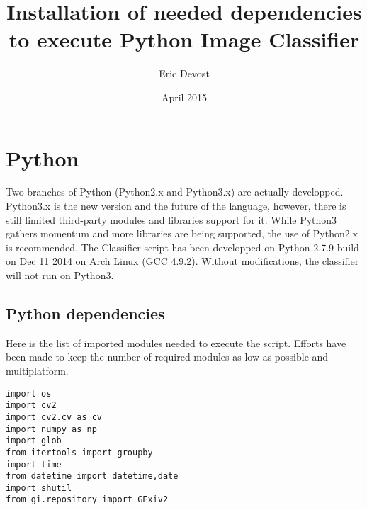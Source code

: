 \documentclass[a4paper, 11pt]{article}
\title{Installation of needed dependencies to execute Python Image Classifier}
\author{Eric Devost}
\date{April 2015}
\begin{document}
\maketitle
\newpage

\section{Python}
Two branches of Python (Python2.x and Python3.x) are actually developped. Python3.x is the new version and the future of the language, however, there is still limited third-party modules and libraries support for it. While Python3 gathers momentum and more libraries are being supported, the use of Python2.x is recommended. The Classifier script has been developped on Python 2.7.9 build on Dec 11 2014 on Arch Linux (GCC 4.9.2). Without modifications, the classifier will not run on Python3.

\subsection{Python dependencies}
Here is the list of imported modules needed to execute the script. Efforts have been made to keep the number of required modules as low as possible and multiplatform.

\begin{lstlisting}
import os
import cv2
import cv2.cv as cv
import numpy as np
import glob
from itertools import groupby
import time
from datetime import datetime,date
import shutil
from gi.repository import GExiv2

\end{lstlisting}
\end{document}
